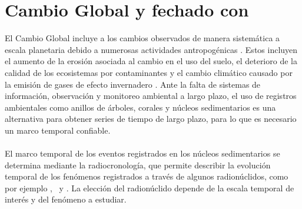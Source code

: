 \section{Cambio Global y fechado con \PbCero}\label{Sección-1}
El Cambio Global incluye a los cambios observados de manera sistemática a escala planetaria debido a numerosas actividades antropogénicas \cite{CambioGlobal}. Estos incluyen el aumento de la erosión asociada al cambio en el uso del suelo, el deterioro de la calidad de los ecosistemas por contaminantes y el cambio climático causado por la emisión de gases de efecto invernadero \cite{ALowCostLongTerm}. Ante la falta de sistemas de información, observación y monitoreo ambiental a largo plazo, el uso de registros ambientales como anillos de árboles, corales y núcleos sedimentarios es una alternativa para obtener series de tiempo de largo plazo, para lo que es necesario un marco temporal confiable.
\\
\\ 
El marco temporal de los eventos registrados en los núcleos sedimentarios se determina mediante la radiocronología, que permite describir la evolución temporal de los fenómenos registrados a través de algunos radionúclidos, como por ejemplo \PbCero, \Ra\, y \Cs. La elección del radionúclido depende de la escala temporal de interés y del fenómeno a estudiar. 

